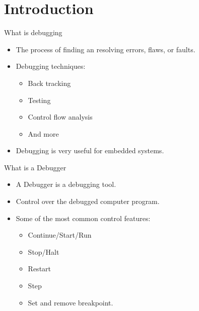 \section{Introduction}

\begin{frame}{What is debugging}
    \begin{itemize}
        \item The process of finding an resolving errors, flaws, or faults.
        \item Debugging techniques:
    	\begin{itemize} %
    	    \item Back tracking
    	    \item Testing
    	    \item Control flow analysis
    	    \item And more
    	\end{itemize}
        \item Debugging is very useful for embedded systems.
    \end{itemize}
\end{frame}


\begin{frame}{What is a Debugger}
    \begin{itemize}
        \item A Debugger is a debugging tool.
        \item Control over the debugged computer program.
        \item Some of the most common control features:
    	\begin{itemize}
    	    \item Continue/Start/Run
    	    \item Stop/Halt
    	    \item Restart
    	    \item Step
    	    \item Set and remove breakpoint.
    	\end{itemize}
    \end{itemize}
\end{frame}

